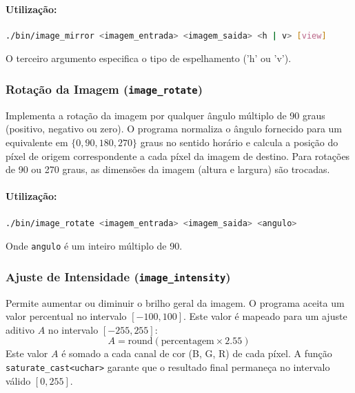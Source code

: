 \documentclass[a4paper, 11pt, portuguese]{article}
\begin{document}
\paragraph{Utilização:}
\begin{lstlisting}[language=bash, caption=Sintaxe de Uso do image\_mirror]
./bin/image_mirror <imagem_entrada> <imagem_saida> <h | v> [view]
\end{lstlisting}
O terceiro argumento especifica o tipo de espelhamento ('h' ou 'v').


\subsubsection{Rotação da Imagem (\texttt{image\_rotate})}
Implementa a rotação da imagem por qualquer ângulo múltiplo de 90 graus (positivo, negativo ou zero). O programa normaliza o ângulo fornecido para um equivalente em $\{0, 90, 180, 270\}$ graus no sentido horário e calcula a posição do píxel de origem correspondente a cada píxel da imagem de destino. Para rotações de 90 ou 270 graus, as dimensões da imagem (altura e largura) são trocadas.

\paragraph{Utilização:}
\begin{lstlisting}[language=bash, caption=Sintaxe de Uso do image\_rotate]
./bin/image_rotate <imagem_entrada> <imagem_saida> <angulo>
\end{lstlisting}
Onde \texttt{angulo} é um inteiro múltiplo de 90.


\subsubsection{Ajuste de Intensidade (\texttt{image\_intensity})}
Permite aumentar ou diminuir o brilho geral da imagem. O programa aceita um valor percentual no intervalo $[-100, 100]$. Este valor é mapeado para um ajuste aditivo $A$ no intervalo $[-255, 255]$:
$$ A = \text{round}(\text{percentagem} \times 2.55) $$
Este valor $A$ é somado a cada canal de cor (B, G, R) de cada píxel. A função \texttt{saturate\_cast<uchar>} garante que o resultado final permaneça no intervalo válido $[0, 255]$.
\end{document}
